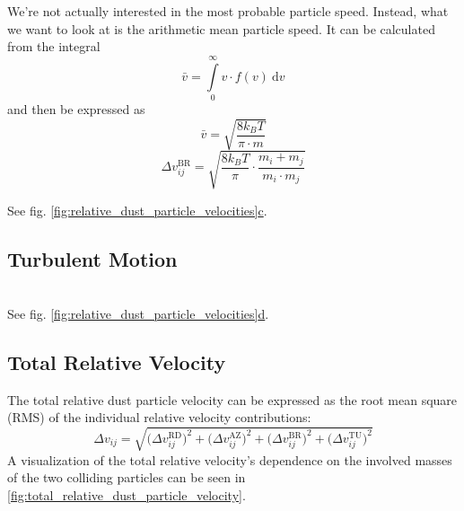         We're not actually interested in the most probable particle speed.
        Instead, what we want to look at is the arithmetic mean particle speed.
        It can be calculated from the integral 
        \begin{equation}
            \bar{v}
            =\int\limits_0^\infty v\cdot f(v)\ \text{d}v
        \end{equation}
        and then be expressed as
        \begin{equation}
            \bar{v}
            =\sqrt{\frac{8k_BT}{\pi\cdot m}}
        \end{equation}
        \begin{equation}
            \Delta v_{ij}^\text{BR}
            =\sqrt{\frac{8k_BT}{\pi}\cdot\frac{m_i+m_j}{m_i\cdot m_j}}
        \end{equation}

        See fig. 
        \hyperref[fig:relative_dust_particle_velocities]{\ref*{fig:relative_dust_particle_velocities}c}.

    \subsection{Turbulent Motion}

         \\
    
        See fig.
        \hyperref[fig:relative_dust_particle_velocities]{\ref*{fig:relative_dust_particle_velocities}d}.

    \subsection{Total Relative Velocity}

        The total relative dust particle velocity can be expressed as the root mean square (RMS) of 
        the individual relative velocity contributions:
        \begin{equation}
            \Delta v_{ij}
                = \sqrt{
                    \big(\Delta v^\text{RD}_{ij}\big)^2
                    + \big(\Delta v^\text{AZ}_{ij}\big)^2
                    + \big(\Delta v^\text{BR}_{ij}\big)^2
                    + \big(\Delta v^\text{TU}_{ij}\big)^2
                }
        \end{equation}
        A visualization of the total relative velocity's dependence on the involved masses of the
        two colliding particles can be seen in \cref{fig:total_relative_dust_particle_velocity}.

